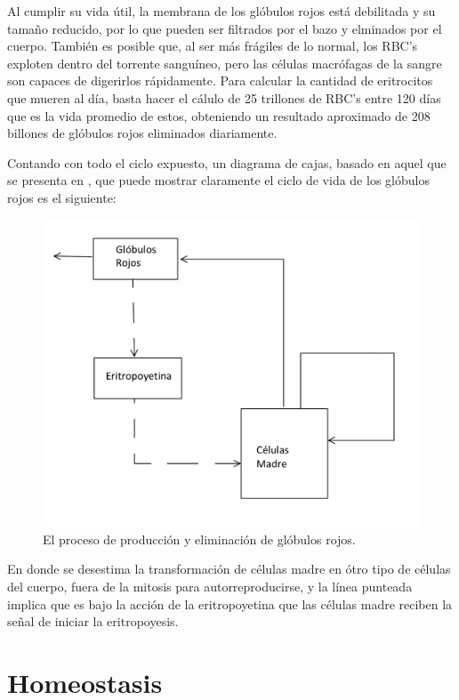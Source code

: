 Al cumplir su vida útil, la membrana de los glóbulos rojos está debilitada y su tamaño reducido, por lo que pueden ser filtrados por el bazo y elminados por el cuerpo. También es posible que, al ser más frágiles de lo normal, los RBC's exploten dentro del torrente sanguíneo, pero las células macrófagas de la sangre son capaces de digerirlos rápidamente. Para calcular la cantidad de eritrocitos que mueren al día, basta hacer el cálulo de 25 trillones de RBC's entre 120 días que es la vida promedio de estos, obteniendo un resultado aproximado de 208 billones de glóbulos rojos eliminados diariamente.

Contando con todo el ciclo expuesto, un diagrama de cajas, basado en aquel que se presenta en \cite{kirk1968mathematical}, que puede mostrar claramente el ciclo de vida de los glóbulos rojos es el siguiente:
\begin{figure}[H]
    \centering
    \includegraphics[scale=0.3]{figures/VidaRBC.jpeg}
    \caption{El proceso de producción y eliminación de glóbulos rojos.}
    \label{sec:RBC:fig:VidaRBC}
\end{figure}

En donde se desestima la transformación de células madre en ótro tipo de células del cuerpo, fuera de la mitosis para autorreproducirse, y la línea punteada implica que es bajo la acción de la eritropoyetina que las células madre reciben la señal de iniciar la eritropoyesis.

\section{Homeostasis}\label{sec:RBC:homeostasis}

